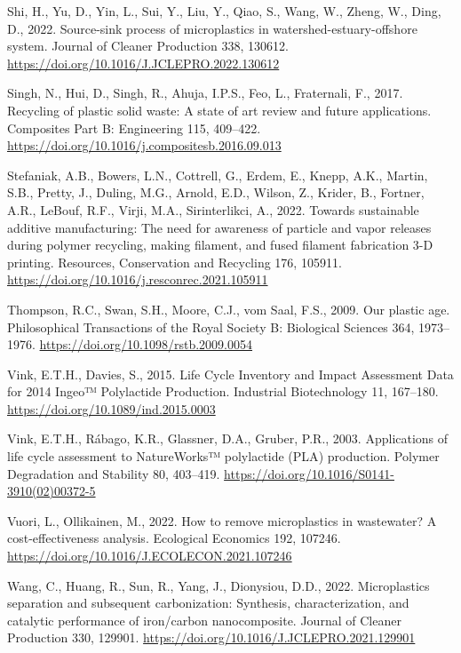 \documentclass[12pt]{elsarticle} %
\newlength{\cslhangindent}
\newlength{\cslentryspacingunit} %
\newenvironment{CSLReferences}[2] %
 {%
  \setlength{\parindent}{0pt}
  \ifodd #1
  \let\oldpar\par
  \def\par{\hangindent=\cslhangindent\oldpar}
  \fi
  \setlength{\parskip}{#2\cslentryspacingunit}
 }%
 {}
\begin{document}
\begin{CSLReferences}{1}{0}
\leavevmode{}%
Shi, H., Yu, D., Yin, L., Sui, Y., Liu, Y., Qiao, S., Wang, W., Zheng, W., Ding, D., 2022. Source-sink process of microplastics in watershed-estuary-offshore system. Journal of Cleaner Production 338, 130612. \url{https://doi.org/10.1016/J.JCLEPRO.2022.130612}

\leavevmode{}%
Singh, N., Hui, D., Singh, R., Ahuja, I.P.S., Feo, L., Fraternali, F., 2017. Recycling of plastic solid waste: {A} state of art review and future applications. Composites Part B: Engineering 115, 409--422. \url{https://doi.org/10.1016/j.compositesb.2016.09.013}

\leavevmode{}%
Stefaniak, A.B., Bowers, L.N., Cottrell, G., Erdem, E., Knepp, A.K., Martin, S.B., Pretty, J., Duling, M.G., Arnold, E.D., Wilson, Z., Krider, B., Fortner, A.R., LeBouf, R.F., Virji, M.A., Sirinterlikci, A., 2022. Towards sustainable additive manufacturing: {The} need for awareness of particle and vapor releases during polymer recycling, making filament, and fused filament fabrication 3-{D} printing. Resources, Conservation and Recycling 176, 105911. \url{https://doi.org/10.1016/j.resconrec.2021.105911}

\leavevmode{}%
Thompson, R.C., Swan, S.H., Moore, C.J., vom Saal, F.S., 2009. Our plastic age. Philosophical Transactions of the Royal Society B: Biological Sciences 364, 1973--1976. \url{https://doi.org/10.1098/rstb.2009.0054}

\leavevmode{}%
Vink, E.T.H., Davies, S., 2015. Life {Cycle Inventory} and {Impact Assessment Data} for 2014 {Ingeo}™ {Polylactide Production}. Industrial Biotechnology 11, 167--180. \url{https://doi.org/10.1089/ind.2015.0003}

\leavevmode{}%
Vink, E.T.H., Rábago, K.R., Glassner, D.A., Gruber, P.R., 2003. Applications of life cycle assessment to {NatureWorks}™ polylactide ({PLA}) production. Polymer Degradation and Stability 80, 403--419. \url{https://doi.org/10.1016/S0141-3910(02)00372-5}

\leavevmode{}%
Vuori, L., Ollikainen, M., 2022. How to remove microplastics in wastewater? {A} cost-effectiveness analysis. Ecological Economics 192, 107246. \url{https://doi.org/10.1016/J.ECOLECON.2021.107246}

\leavevmode{}%
Wang, C., Huang, R., Sun, R., Yang, J., Dionysiou, D.D., 2022. Microplastics separation and subsequent carbonization: {Synthesis}, characterization, and catalytic performance of iron/carbon nanocomposite. Journal of Cleaner Production 330, 129901. \url{https://doi.org/10.1016/J.JCLEPRO.2021.129901}


\end{CSLReferences}
\end{document}
